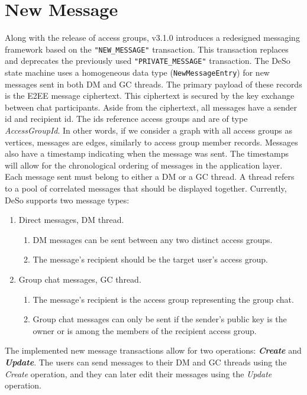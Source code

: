 \documentclass[oneside, 12pt]{article}
\begin{document}
\section{New Message}
Along with the release of access groups, v3.1.0 introduces a redesigned messaging framework based on the \texttt{"NEW\_MESSAGE"} transaction. This transaction replaces and deprecates the previously used \texttt{"PRIVATE\_MESSAGE"} transaction. The DeSo state machine uses a homogeneous data type (\texttt{NewMessageEntry}) for new messages sent in both DM and GC threads. The primary payload of these records is the E2EE message ciphertext. This ciphertext is secured by the key exchange between chat participants. Aside from the ciphertext, all messages have a sender id and recipient id. The ids reference access groups and are of type \textit{AccessGroupId}. In other words, if we consider a graph with all access groups as vertices, messages are edges, similarly to access group member records. Messages also have a timestamp indicating when the message was sent. The timestamps will allow for the chronological ordering of messages in the application layer.\\

\noindent Each message sent must belong to either a DM or a GC thread. A thread refers to a pool of correlated messages that should be displayed together. Currently, DeSo supports two message types:

\begin{enumerate}
  \item Direct messages, DM thread.
  \begin{enumerate}
    \item DM messages can be sent between any two distinct access groups.
    \item The message's recipient should be the target user's access group.
  \end{enumerate}
  \item Group chat messages, GC thread.
  \begin{enumerate}
    \item The message's recipient is the access group representing the group chat.
    \item Group chat messages can only be sent if the sender's public key is the owner or is among the members of the recipient access group.
  \end{enumerate}
\end{enumerate}

\noindent The implemented new message transactions allow for two operations: \textbf{\textit{Create}} and \textbf{\textit{Update}}. The users can send messages to their DM and GC threads using the \textit{Create} operation, and they can later edit their messages using the \textit{Update} operation.
\end{document}
